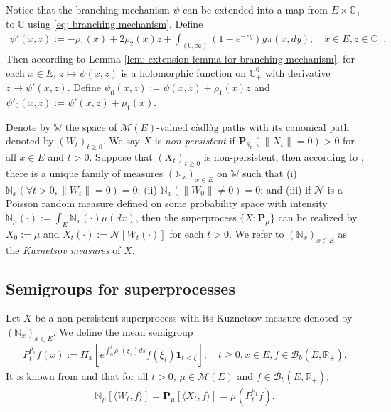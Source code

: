 \documentclass[12pt,a4paper]{amsart}
\theoremstyle{plain}
\theoremstyle{definition}
\numberwithin{equation}{section}
\begin{document}
Notice that the branching mechanism $\psi$ can be extended into a map from $E \times \mathbb C_+$ to $\mathbb C$ using \eqref{eq: branching mechanism}.
Define
\begin{align}
  \psi'(x,z)
  := - \rho_1(x) + 2\rho_2(x) z + \int_{(0,\infty)} (1-e^{-zy})y\pi(x,dy),
  \quad x\in E, z\in \mathbb C_+.
\end{align}
Then according to Lemma \ref{lem: extension lemma for branching mechanism}, for each $x \in E$, $z \mapsto \psi(x,z)$ is a holomorphic function on $\mathbb C_+^0$ with derivative $z \mapsto \psi'(x,z)$.
Define $\psi_0(x,z) := \psi(x,z)+ \rho_1(x)z $ and $\psi'_0(x,z) := \psi'(x,z) + \rho_1(x)$.

Denote by $\mathbb W$ the space of $\mathcal M(E)$-valued c\`{a}dl\`{a}g paths with its canonical path denoted by $(W_t)_{t\geq 0}$.
We say $X$ is \emph{non-persistent} if $\mathbf P_{\delta_x}(\|X_t\|= 0) > 0$ for all $x\in E$ and $t> 0$.
Suppose that $(X_t)_{t\geq 0}$ is non-persistent, then according to \cite[Section 8.4]{Li2011Measure-valued}, there is a unique family of measures $(\mathbb N_x)_{x\in E}$ on $\mathbb W$ such that
(i) $\mathbb N_x (\forall t > 0, \|W_t\|=0) =0$;
(ii) $\mathbb N_x(\|W_0 \|\neq 0) = 0$;
and (iii) if $\mathcal N$ is a Poisson random measure defined on some probability space with intensity $\mathbb N_\mu(\cdot):= \int_E \mathbb N_x(\cdot )\mu(dx)$, then the superprocess $\{X;\mathbf P_\mu\}$ can be realized by $\widetilde X_0 := \mu$ and $\widetilde X_t(\cdot) := \mathcal N[W_t(\cdot)]$ for each $t>0$.
We refer to $(\mathbb N_x)_{x\in E}$ as the \emph{Kuznetsov measures} of $X$.

\subsection{Semigroups for superprocesses}
\label{sec: definition of vf}
Let $X$ be a non-persistent superprocess with its Kuznetsov measure denoted by $(\mathbb N_x)_{x\in E}$.
We define the mean semigroup
\begin{align}
  P_t^{\rho_1} f(x)
  := \Pi_{x}[e^{\int_0^t \rho_1(\xi_s)ds}f(\xi_t) \mathbf 1_{t< \zeta}],
  \quad t\geq 0, x\in E, f\in \mathcal B_b(E,\mathbb R_+).
\end{align}
It is known from \cite[Proposition 2.27]{Li2011Measure-valued} and \cite[Theorem 2.7]{Kyprianou2014Fluctuations} that for all $t > 0$, $\mu \in \mathcal M(E)$ and $f\in \mathcal B_b(E,\mathbb R_+)$,
\begin{align}
  \label{eq: mean formula for superprocesses}
  \mathbb N_{\mu}[\langle W_t, f\rangle]
  =\mathbf P_{\mu}[\langle X_t, f\rangle]
  =\mu(P^{\rho_1}_t f).
\end{align}
\end{document}
